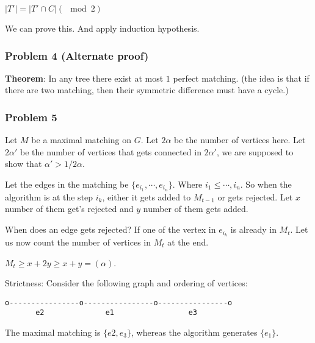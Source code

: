 \documentclass[11pt]{article}
\begin{document}
\(\vert T' \vert = \vert T' \cap C \vert (\mod 2)\)

We can prove this. And apply induction hypothesis.
\subsubsection{Problem 4 (Alternate proof)}
\label{sec:org5bf109d}
\textbf{Theorem}: In any tree there exist at most \(1\) perfect matching. (the idea
 is that if there are two matching, then their symmetric difference must
 have a cycle.)
\subsubsection{Problem 5}
\label{sec:org50a80cd}
Let \(M\) be a maximal matching on \(G\). Let \(2\alpha\) be the number of
vertices here. Let \(2\alpha'\) be the number of vertices that gets connected
in \(2\alpha'\), we are supposed to show that \(\alpha' > 1/2 \alpha\).

Let the edges in the matching be \(\{e_{i_1}, \cdots, e_{i_n}\}\). Where \(i_1
    \le \cdots, i_n\). So when the algorithm is at the step \(i_k\), either it gets
added to \(M_{t-1}\) or gets rejected. Let \(x\) number of them get's rejected
and \(y\) number of them gets added.

When does an edge gets rejected? If one of the vertex in \(e_{i_k}\) is
already in \(M_{t}\). Let us now count the number of vertices in \(M_t\) at the
end.

\(M_t \ge x + 2y \ge x+y = (\alpha)\).

Strictness: Consider the following graph and ordering of vertices:
\begin{verbatim}
o----------------o----------------o----------------o
       e2              e1                 e3       
\end{verbatim}

The maximal matching is \(\{e2, e_3\}\), whereas the algorithm generates
\(\{e_1\}\).
\end{document}
